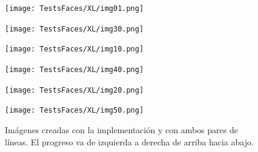 \documentclass[conference]{IEEEtran}
\begin{document}
\begin{figure}[H]
\begin{multicols}{3}
    \centering
    \texttt{[image: TestsFaces/XL/img01.png]} \par
    \texttt{[image: TestsFaces/XL/img30.png]} \par
    
    \texttt{[image: TestsFaces/XL/img10.png]} \par
    \texttt{[image: TestsFaces/XL/img40.png]} \par

    \texttt{[image: TestsFaces/XL/img20.png]} \par
    \texttt{[image: TestsFaces/XL/img50.png]} \par
\end{multicols}
\caption{Imágenes creadas con la implementación y con ambos pares de líneas. El progreso va de izquierda a derecha de arriba hacia abajo.}
\end{figure}
\end{document}
